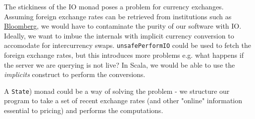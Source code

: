 The stickiness of the IO monad poses a problem for currency exchanges.
Assuming foreign exchange rates can be retrieved from institutions such as
\href{http://www.bloomberg.com/markets/currencies/}{Bloomberg}, we would 
have to contaminate the purity of our software with IO. Ideally, we want to
imbue the internals with implicit currency conversion to accomodate for
intercurrency swaps. \texttt{unsafePerformIO} could be used to fetch the foreign
exchange rates, but this introduces more problems e.g. what happens if the
server we are querying is not live?
In Scala, we would be able to use the \emph{implicits} construct to perform
the conversions.

A \texttt{State}) monad could be a way of solving the problem - we structure
our program to take a set of recent exchange rates (and other "online"
information essential to pricing) and performs the computations.

